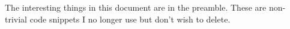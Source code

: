 \documentclass[a4paper,12pt,twoside]{article}
\begin{document}
The interesting things in this document are in the preamble. These are
non-trivial code snippets I no longer use but don't wish to delete.

\newpage

\printbibliography
\end{document}
